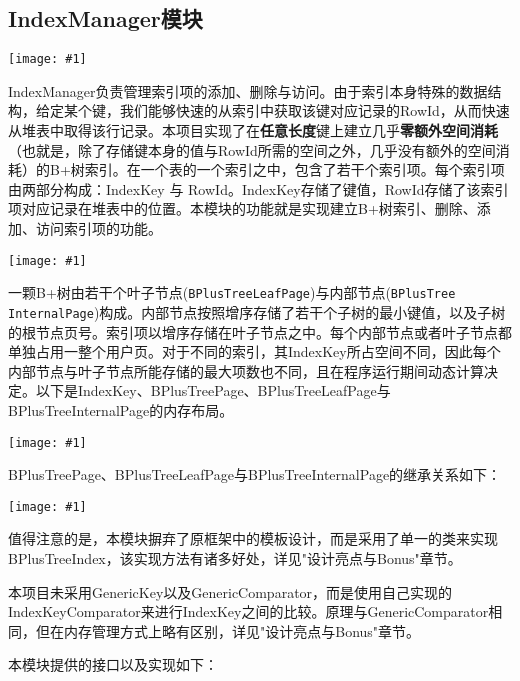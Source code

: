 \documentclass[12pt, a4paper]{article}
\def\c#1{\texttt{#1}}
\def\b#1{\textbf{#1}}
\def\ss#1{\subsection{#1}}
\def\p{\par}
\def\g#1{\begin{center}\texttt{[image: \#1]}\end{center}}
\def\gm#1{\begin{center}\texttt{[image: \#1]}\end{center}}
\begin{document}
\ss{IndexManager模块}
\gm{b_plus_tree_index.pdf}
\p IndexManager负责管理索引项的添加、删除与访问。由于索引本身特殊的数据结构，给定某个键，我们能够快速的从索引中获取该键对应记录的RowId，从而快速从堆表中取得该行记录。本项目实现了在\b{任意长度}键上建立几乎\b{零额外空间消耗}（也就是，除了存储键本身的值与RowId所需的空间之外，几乎没有额外的空间消耗）的B+树索引。在一个表的一个索引之中，包含了若干个索引项。每个索引项由两部分构成：IndexKey 与 RowId。IndexKey存储了键值，RowId存储了该索引项对应记录在堆表中的位置。本模块的功能就是实现建立B+树索引、删除、添加、访问索引项的功能。
\g{b_plus_tree.pdf}
\p 一颗B+树由若干个叶子节点(\c{BPlusTreeLeafPage})与内部节点(\c{BPlusTree InternalPage})构成。内部节点按照增序存储了若干个子树的最小键值，以及子树的根节点页号。索引项以增序存储在叶子节点之中。每个内部节点或者叶子节点都单独占用一整个用户页。对于不同的索引，其IndexKey所占空间不同，因此每个内部节点与叶子节点所能存储的最大项数也不同，且在程序运行期间动态计算决定。以下是IndexKey、BPlusTreePage、BPlusTreeLeafPage与BPlusTreeInternalPage的内存布局。
\g{b_plus_tree_pages.pdf}
BPlusTreePage、BPlusTreeLeafPage与BPlusTreeInternalPage的继承关系如下：
\g{b_plus_tree_page_inherit.pdf}
\p 值得注意的是，本模块摒弃了原框架中的模板设计，而是采用了单一的类来实现BPlusTreeIndex，该实现方法有诸多好处，详见"设计亮点与Bonus"章节。
\p 本项目未采用GenericKey以及GenericComparator，而是使用自己实现的IndexKeyComparator来进行IndexKey之间的比较。原理与GenericComparator相同，但在内存管理方式上略有区别，详见"设计亮点与Bonus"章节。
\p 本模块提供的接口以及实现如下：
\end{document}
